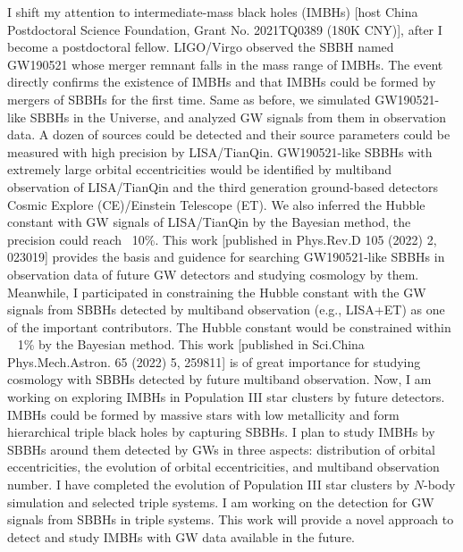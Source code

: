\documentclass[12pt,a4paper,sans]{article}%
\begin{document}
I shift my attention to intermediate-mass black holes (IMBHs) [host China Postdoctoral Science Foundation, Grant No. 2021TQ0389 (180K CNY)], after I become a postdoctoral fellow. LIGO/Virgo observed the SBBH named
GW190521 whose merger remnant falls in the mass range of IMBHs. The event directly confirms the existence of
IMBHs and that IMBHs could be formed by mergers of SBBHs for the first time. Same as before, we simulated GW190521-like SBBHs in the
Universe, and analyzed GW signals from them in observation data. A dozen of sources could be detected and their source
parameters could be measured with high precision by LISA/TianQin. GW190521-like SBBHs with extremely large orbital
eccentricities would be identified by
multiband observation of LISA/TianQin and the third generation ground-based detectors Cosmic Explore (CE)/Einstein
Telescope (ET). We also inferred the Hubble constant with GW signals of LISA/TianQin by the Bayesian method, the precision could reach
~10\%. This work [published in Phys.Rev.D 105 (2022) 2, 023019] provides
the basis and guidence for searching GW190521-like SBBHs in observation data of future GW detectors and studying
cosmology by them. Meanwhile, I participated in constraining the Hubble
constant with the GW signals from SBBHs detected by multiband observation (e.g., LISA+ET) as one of the important
contributors. The Hubble constant would be constrained within ~ 1\% by the Bayesian method. This work [published in Sci.China Phys.Mech.Astron. 65 (2022) 5, 259811] is of great
importance for studying cosmology with SBBHs detected by future multiband observation. Now, I am working on
exploring IMBHs in Population III star clusters by future detectors. IMBHs could be
formed by massive stars with low metallicity and form hierarchical triple black holes by capturing SBBHs. I plan to
study IMBHs by SBBHs around them detected by GWs in three aspects: distribution of orbital
eccentricities, the evolution of orbital eccentricities, and multiband observation number. I have completed the evolution of
Population III star clusters by $N$-body simulation and selected triple systems. I am working on the detection for 
GW signals from SBBHs in triple systems. This work will provide a novel
approach to detect and study IMBHs with GW data available in the future.
\end{document}
